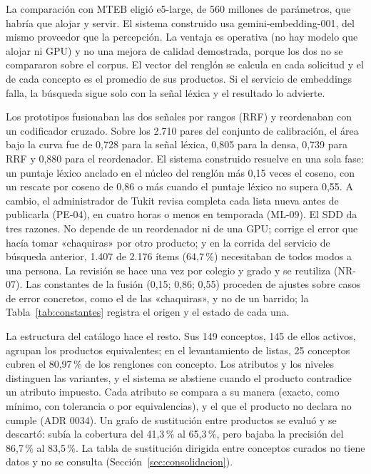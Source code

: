 La comparación con MTEB
\citep{muennighoff_mteb_2023} eligió e5-large, de 560 millones de parámetros, que habría que alojar
y servir. El sistema construido usa gemini-embedding-001, del mismo proveedor que la percepción. La
ventaja es operativa (no hay modelo que alojar ni GPU) y no una mejora de calidad demostrada, porque
los dos no se compararon sobre el corpus. El vector del renglón se calcula en cada solicitud y el de
cada concepto es el promedio de sus productos. Si el servicio de embeddings falla, la búsqueda sigue
solo con la señal léxica y el resultado lo advierte.

Los prototipos
fusionaban las dos señales por rangos (RRF) y reordenaban con un codificador cruzado. Sobre los
2.710 pares del conjunto de calibración, el área bajo la curva fue de 0,728 para la señal léxica,
0,805 para la densa, 0,739 para RRF y 0,880 para el reordenador. El sistema construido resuelve en
una sola fase: un puntaje léxico anclado en el núcleo del renglón más 0,15 veces el coseno, con un
rescate por coseno de 0,86 o más cuando el puntaje léxico no supera 0,55. A cambio, el
administrador de Tukit revisa completa cada lista nueva antes de publicarla (PE-04), en cuatro horas
o menos en temporada (ML-09). El SDD da tres razones. No depende de un reordenador ni de una GPU;
corrige el error que hacía tomar «chaquiras» por otro producto; y en la corrida del servicio de
búsqueda anterior, 1.407 de 2.176 ítems (64,7\,\%) necesitaban de todos modos a una persona. La
revisión se hace una vez por colegio y grado y se reutiliza (NR-07). Las constantes de la fusión (0,15; 0,86; 0,55) proceden de ajustes sobre casos de error
concretos, como el de las «chaquiras», y no de un barrido; la Tabla~\ref{tab:constantes} registra el
origen y el estado de cada una.

La estructura del catálogo hace el resto. Sus 149 conceptos, 145 de ellos activos, agrupan los
productos equivalentes; en el levantamiento de listas, 25 conceptos cubren el 80,97\,\% de los
renglones con concepto. Los atributos y los niveles distinguen
las variantes, y el sistema se abstiene cuando el producto contradice un atributo impuesto. Cada
atributo se compara a su manera (exacto, como mínimo, con tolerancia o por equivalencias), y el
que el producto no declara no cumple (ADR 0034). Un grafo
de sustitución entre productos se evaluó y se descartó: subía la cobertura del 41,3\,\% al
65,3\,\%, pero bajaba la precisión del 86,7\,\% al 83,5\,\%. La tabla de sustitución dirigida entre
conceptos curados no tiene datos y no se consulta (Sección~\ref{sec:consolidacion}).

